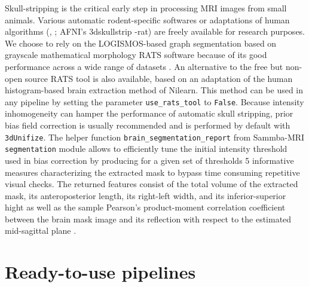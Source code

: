 \documentclass[utf8, a4paper, final, crop]{frontiersSCNS}
\newcommand{\pythoninline}[1]{\texttt{#1}}
\newcommand{\bashinline}[1]{\texttt{#1}}
\begin{document}
Skull-stripping is the critical early step in processing
MRI images from small animals. Various automatic rodent-specific 
softwares \citep{chou2011robust, oguz2014rats} or adaptations of human algorithms (\citeauthor{wood2013rbet}, \citeyear{wood2013rbet}; AFNI's 3dskullstrip -rat)
are freely available for research purposes. We choose to rely on
the LOGISMOS-based graph segmentation \citep{yin2010logimos} based on grayscale mathematical morphology 
RATS software  \citep{oguz2014rats} because
of its good performance across a wide range of datasets \citep{sargolzaei2018comparative}.
An alternative to the free but non-open source RATS tool is also 
available, based on an adaptation of the 
human histogram-based brain extraction method of Nilearn. 
This method can be used in any pipeline by setting the parameter
 \pythoninline{use_rats_tool} to \pythoninline{False}.
Because intensity inhomogeneity can hamper the performance of automatic skull stripping,
prior bias field correction
is usually recommended \citep{sled1998nonparametric} and is performed by default with \bashinline{3dUnifize}.
The helper function \pythoninline{brain_segmentation_report}
from Sammba-MRI \pythoninline{segmentation} module allows to
efficiently tune the initial intensity threshold used in bias correction by
producing for a given set of thresholds 5 informative measures
characterizing the extracted mask to bypass %
time consuming repetitive visual checks.
The returned features %
consist of the total volume of
the extracted mask, its 
anteroposterior length, its right-left width, and its inferior-superior hight as well
as the sample Pearson's product-moment correlation
coefficient between the brain mask image and its reflection
with respect to the estimated mid-sagittal plane
\citep{powell2016fully}.

\section{Ready-to-use pipelines}
\end{document}
